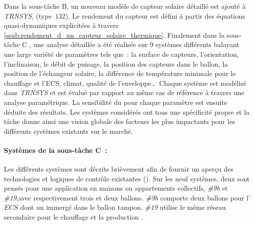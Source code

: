 Dans la sous-tâche B, un nouveau modèle de capteur solaire détaillé est ajouté à
\textit{TRNSYS}, (type~$132$). Le rendement du capteur est défini à partir des équations
quasi-dynamiques explicitées à travers \ref{ssub:rendement_d_un_capteur_solaire_thermique}.
Finalement dans la sous-tâche C \parencite{Task26C2007}, une analyse détaillée a été
réalisée sur $9$ systèmes différents balayant une large variété de paramètres tels que~:
la surface de capteurs, l’orientation, l’inclinaison, le débit de puisage, la position des
capteurs dans le ballon, la position de l’échangeur solaire, la différence de température
minimale pour le chauffage et l’ECS, climat, qualité de l’enveloppe\dots\ Chaque système
est modélisé dans \textit{TRNSYS} et est évalué par rapport au même cas de référence à
travers une analyse paramétrique. La sensibilité du  pour chaque paramètre est
ensuite déduite des résultats. Les systèmes considérés ont tous une spécificité propre et
la tâche donne ainsi une vision globale des facteurs les plus impactants pour les
différents systèmes existants sur le marché.

\paragraph{Systèmes de la sous-tâche C~:} %
\label{par:systemes_de_la_sous_tache_c}
Les différents systèmes sont décrits brièvement afin de fournir un aperçu des
technologies et logiques de contrôle existantes ().
Sur les neuf systèmes, deux sont pensés pour une application en maisons ou appartements
collectifs, \emph{\#9b} et \emph{\#19},avec respectivement trois et deux ballons.
\emph{\#9b} comporte deux ballons pour l’$ECS$ dont un immergé
dans le ballon tampon. \emph{\#19} utilise le même réseau secondaire pour le chauffage
et la production .

